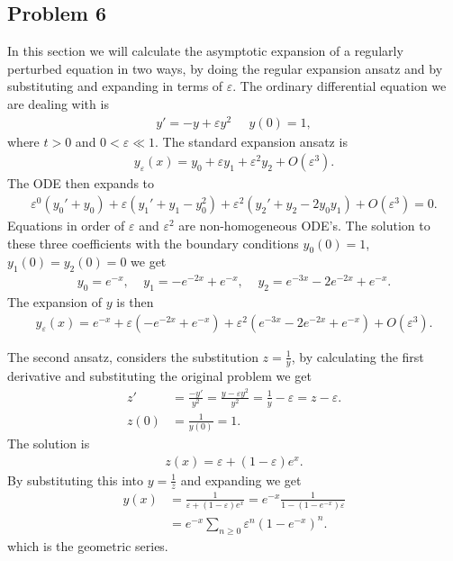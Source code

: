 \documentclass[a4paper]{article}
\newcommand{\eps}{\varepsilon}
\begin{document}
\subsection{Problem 6}
In this section we will calculate the asymptotic expansion of a regularly
perturbed equation in two ways, by doing the regular expansion ansatz and by
substituting and expanding in terms of $\eps$. The ordinary differential
equation we are dealing with is
\begin{align}
    y' = -y + \eps y^2 \;\;\;\;\; y(0) = 1,
\end{align}
where $t > 0$ and $0 < \eps \ll 1$. The standard expansion ansatz is
\begin{align}
y_\eps(x) = y_0 + \eps y_1 + \eps^2 y_2 + O(\eps^3).
\end{align}
The ODE then expands to
\begin{align}
    \eps^0(y_0' + y_0) + \eps(y_1' + y_1 - y_0^2) + \eps^2(y_2' + y_2 -
    2y_0y_1) + O(\eps^3) = 0.
\end{align}
Equations in order of $\eps$ and $\eps^2$ are non-homogeneous ODE's. The
solution to these three coefficients with the boundary conditions $y_0(0) =
1$, $y_1(0) =
y_2(0) = 0$ we get
\begin{align}
    y_0 = e^{-x}, \;\;\;\; y_1 = -e^{-2x} + e^{-x}, \;\;\;\; y_2 = e^{-3x} -
    2e^{-2x} + e^{-x}.
\end{align}
The expansion of $y$ is then
\begin{align}
    y_\eps (x) = e^{-x} + \eps(-e^{-2x} + e^{-x}) + \eps^2(e^{-3x} - 2e^{-2x}
+ e^{-x}) + O(\eps^3).  \end{align}

The second ansatz, considers the substitution $z = \frac{1}{y}$, by
calculating the first derivative and substituting the original problem we
get
\begin{align}
    z' &= \frac{-y'}{y^2} = \frac{y-\eps y^2}{y^2} = \frac{1}{y} - \eps = z -
    \eps. \\
    z(0) &= \frac{1}{y(0)} = 1.
\end{align}
The solution is
\begin{align}
    z(x) = \eps + (1-\eps) e^x.
\end{align}
By substituting this into $y = \frac{1}{z}$ and expanding we get
\begin{align}
    y(x) &= \frac{1}{\eps+(1-\eps)e^x} = e^{-x} \frac{1}{1 - (1- e^{-x})\eps}
    \\
         &= e^{-x} \sum_{n\geq 0} \eps^n(1-e^{-x})^n.
\end{align}
which is the geometric series.
\end{document}
